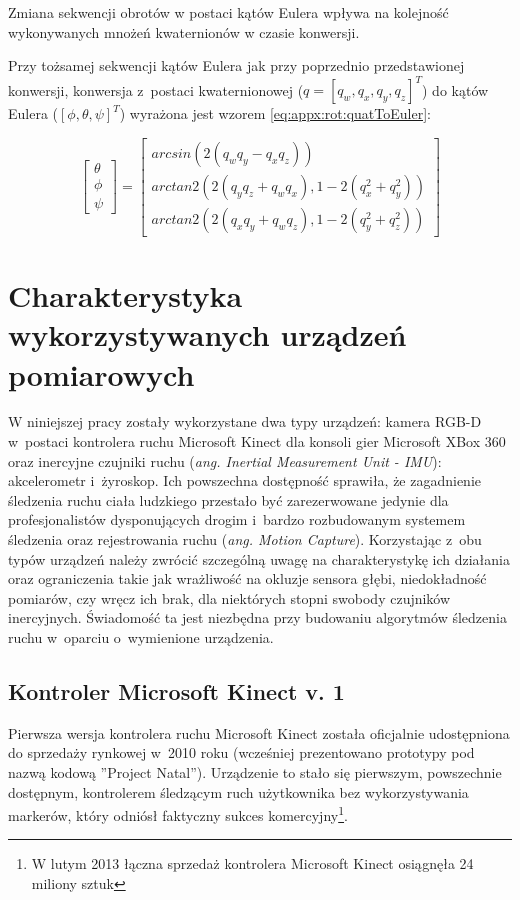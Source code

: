 Zmiana sekwencji obrotów w postaci kątów Eulera	wpływa na kolejność wykonywanych mnożeń kwaternionów w czasie konwersji.

Przy tożsamej sekwencji kątów Eulera jak przy poprzednio przedstawionej konwersji, konwersja z~postaci kwaternionowej ($q = [q_w, q_x, q_y, q_z]^T$) do kątów Eulera ($[\phi, \theta, \psi]^T$) wyrażona jest wzorem \ref{eq:appx:rot:quatToEuler}:
		
\begin{equation}
	\label{eq:appx:rot:quatToEuler}
	\begin{bmatrix}\theta \\ \phi \\ \psi \end{bmatrix} =	
	\begin{bmatrix}                                                   
		arcsin(2(q_w q_y - q_x q_z))                      \\
		arctan2(2(q_y q_z + q_w q_x), 1-2(q_x^2 + q_y^2)) \\
		arctan2(2(q_x q_y + q_w q_z), 1-2(q_y^2 + q_z^2)) 
	\end{bmatrix} 		
\end{equation}
		
																													
\section{Charakterystyka wykorzystywanych urządzeń pomiarowych}\label{chap:characteristics}
W niniejszej pracy zostały wykorzystane dwa typy urządzeń: kamera RGB-D w~postaci kontrolera ruchu Microsoft Kinect dla konsoli gier Microsoft XBox 360 oraz inercyjne czujniki ruchu (\emph{ang. Inertial Measurement Unit - IMU}): akcelerometr i~żyroskop. Ich powszechna dostępność sprawiła, że zagadnienie śledzenia ruchu ciała ludzkiego przestało być zarezerwowane jedynie dla profesjonalistów dysponujących drogim i~bardzo rozbudowanym systemem śledzenia oraz rejestrowania ruchu (\emph{ang. Motion Capture}). Korzystając z~obu typów urządzeń należy zwrócić szczególną uwagę na charakterystykę ich działania oraz ograniczenia takie jak wrażliwość na okluzje sensora głębi, niedokładność pomiarów, czy wręcz ich brak, dla niektórych stopni swobody czujników inercyjnych. Świadomość ta jest niezbędna przy budowaniu algorytmów śledzenia ruchu w~oparciu o~wymienione urządzenia. 
																													
\subsection{Kontroler Microsoft Kinect v. 1}\label{sec:characteristics:kinect}
Pierwsza wersja kontrolera ruchu Microsoft Kinect została oficjalnie udostępniona do sprzedaży rynkowej w~2010 roku (wcześniej prezentowano prototypy pod nazwą kodową ''Project Natal''). Urządzenie to stało się pierwszym, powszechnie dostępnym, kontrolerem śledzącym ruch użytkownika bez wykorzystywania markerów, który odniósł faktyczny sukces komercyjny\footnote{W lutym 2013 łączna sprzedaż kontrolera Microsoft Kinect osiągnęła 24 miliony sztuk}.  
																													

